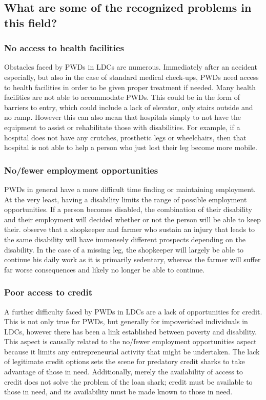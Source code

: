 \documentclass[a4paper]{article}
\begin{document}
\subsection{What are some of the recognized problems in this field?}

\subsubsection{No access to health facilities}

Obstacles faced by PWDs in LDCs are numerous. Immediately after an accident
especially, but also in the case of standard medical check-ups, PWDs need
access to health facilities in order to be given proper treatment if needed.
Many health facilities are not able to accommodate PWDs. This could be in the
form of barriers to entry, which could include a lack of elevator, only stairs
outside and no ramp. However this can also mean that hospitals simply to not
have the equipment to assist or rehabilitate those with disabilities. For
example, if a hospital does not have any crutches, prosthetic legs or
wheelchairs, then that hospital is not able to help a person who just lost
their leg become more mobile. 


\subsubsection{No/fewer employment opportunities}

PWDs in general have a more difficult time finding or maintaining employment.
At the very least, having a disability limits the range of possible employment
opportunities. If a person becomes disabled, the combination of their
disability and their employment will decided whether or not the person will be
able to keep their. \cite{chowdhury2006economics} observe that a shopkeeper
and farmer who sustain an injury that leads to the same disability will have
immensely different prospects depending on the disability. In the case of a
missing leg, the shopkeeper will largely be able to continue his daily work as
it is primarily sedentary, whereas the farmer will suffer far worse
consequences and likely no longer be able to continue.

\subsubsection{Poor access to credit}

A further difficulty faced by PWDs in LDCs are a lack of opportunities for
credit. This is not only true for PWDs, but generally for impoverished
individuals in LDCs, however there has been a link established between poverty
and disability. This aspect is causally related to the no/fewer employment
opportunities aspect because it limits any entrepreneurial activity that might
be undertaken. The lack of legitimate credit options sets the scene for
predatory credit sharks to take advantage of those in need. Additionally,
merely the availability of access to credit does not solve the problem of the
loan shark; credit must be available to those in need, and its availability
must be made known to those in need.
\end{document}
